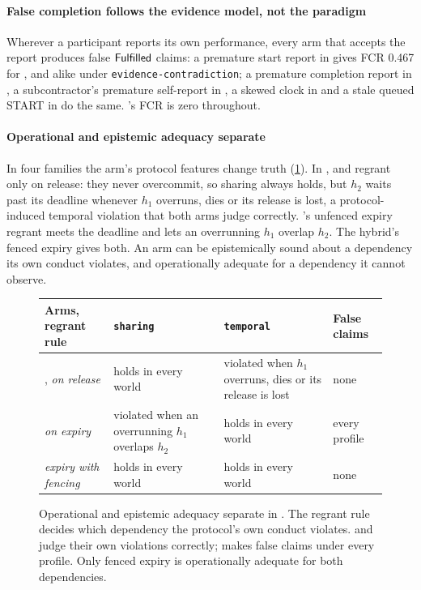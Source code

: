 \paragraph{False completion follows the evidence model, not the paradigm} Wherever a participant reports its own performance, every arm that accepts the report produces false $\mathsf{Fulfilled}$ claims: a premature start report in  gives FCR 0.467 for ,  and  alike under \texttt{evidence-contradiction}; a premature completion report in , a subcontractor's premature self-report in , a skewed clock in  and a stale queued START in  do the same. 's FCR is zero throughout.

\paragraph{Operational and epistemic adequacy separate} In four families the arm's protocol features change truth (\cref{fig:opep}). In ,  and  regrant only on release: they never overcommit, so sharing always holds, but $h_2$ waits past its deadline whenever $h_1$ overruns, dies or its release is lost, a protocol-induced temporal violation that both arms judge correctly. 's unfenced expiry regrant meets the deadline and lets an overrunning $h_1$ overlap $h_2$. The hybrid's fenced expiry gives both. An arm can be epistemically sound about a dependency its own conduct violates, and operationally adequate for a dependency it cannot observe.

\begin{figure}[t]
\centering
\footnotesize
\setlength{\tabcolsep}{3pt}
\renewcommand{\arraystretch}{1.25}
\begin{tabular}{@{}L{19mm} L{21mm} L{25mm} L{11mm}@{}}
\toprule
Arms, regrant rule & \texttt{sharing} & \texttt{temporal} & False claims \\
\midrule
{}, \newline\emph{on release} & holds in every world & violated when $h_1$ overruns, dies or its release is lost & none \\
\newline\emph{on expiry} & violated when an overrunning $h_1$ overlaps $h_2$ & holds in every world & every profile \\
\newline\emph{expiry with fencing} & holds in every world & holds in every world & none \\
\bottomrule
\end{tabular}
\caption{Operational and epistemic adequacy separate in . The regrant rule decides which dependency the protocol's own conduct violates.  and  judge their own violations correctly;  makes false claims under every profile. Only fenced expiry is operationally adequate for both dependencies.}
\label{fig:opep}
\end{figure}

